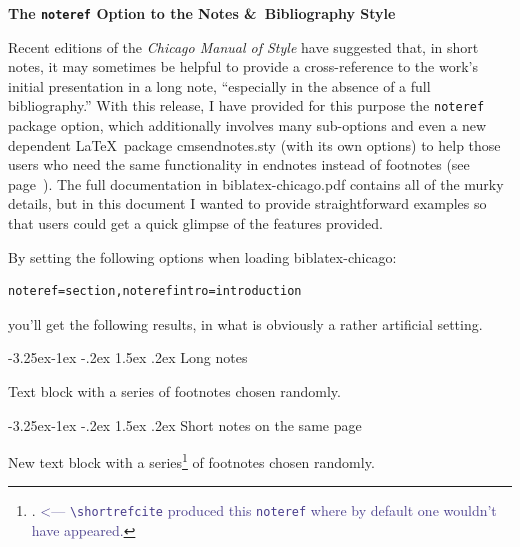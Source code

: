 \documentclass[a4paper,12pt]{article}
\makeatletter
\renewcommand{\section}{\@startsection{section}{1}{\z@}%
                                     {-3.25ex\@plus -1ex \@minus -.2ex}%
                                     {1.5ex \@plus .2ex}%
                                     {\normalfont\large\bfseries}}
\newcommand{\cmd}[1]{\texttt{\textbackslash #1}}
\newcommand{\mylittlespace}{\vspace{5pt}}%
\makeatother
\begin{document}
{\Large\bfseries The \texttt{noteref} Option to the Notes \&\
  Bibliography Style}\label{cms:top}
\vspace*{1.5ex}

Recent editions of the \emph{Chicago Manual of
  Style}\autocite[14.31]{chicago:manual} have suggested that, in short
notes, it may sometimes be helpful to provide a cross-reference to the
work's initial presentation in a long note, \enquote{especially in the
  absence of a full bibliography.}  With this release, I have provided
for this purpose the \texttt{noteref} package option, which
additionally involves many sub-options and even a new dependent
\LaTeX\ package \textsf{cmsendnotes.sty} (with its own options) to
help those users who need the same functionality in endnotes instead
of footnotes (see page~\pageref{cms:endnotes}).  The full
documentation in 
\textsf{biblatex-chicago.pdf} contains all of the murky details, but
in this document I wanted to provide straightforward examples so that
users could get a quick glimpse of the features provided.

\mylittlespace By setting the following options when loading
\textsf{biblatex-chicago}:
\begin{verbatim}
noteref=section,noterefintro=introduction
\end{verbatim}
you'll get the following results, in what is obviously a rather
artificial setting.

\section{Long notes}
\label{sec:one}

Text\autocite{garaud:gatine} block\autocite{leo:madonna}
with\autocite{schubert:muellerin} a\autocite{mchugh:wake}
series\autocite{euripides:orestes} of\autocite{clark:mesopot}
footnotes\autocite{ashbrook:brain} chosen\autocite{contrib:contrib}
randomly.\autocite{frede:inproc}

\section{Short notes on the same page}
\label{sec:two}

New\autocite{chicago:manual} text\autocite{garaud:gatine}
block\autocite{leo:madonna} with\autocite{schubert:muellerin}
a\autocite{mchugh:wake}
series\footnote{.
  \textcolor{DarkSlateBlue}{<--- \cmd{shortrefcite} produced this
    \texttt{noteref} where by default one wouldn't have appeared.}}
of\autocite{clark:mesopot} footnotes\autocite{ashbrook:brain}
chosen\autocite{contrib:contrib} randomly.\autocite{frede:inproc}
\end{document}
